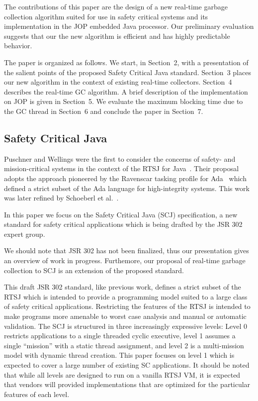 The contributions of this paper are the design of a new real-time garbage
collection algorithm suited for use in safety critical systems and its
implementation in the JOP embedded Java processor. Our preliminary
evaluation suggests that our the new algorithm is efficient and has
highly predictable behavior.

The paper is organized as follows. We start, in Section~2, with a
presentation of the salient points of the proposed Safety Critical
Java standard. Section~3 places our new algorithm in the context of
existing real-time collectors. Section~4 describes the real-time GC
algorithm. A brief description of the implementation on JOP is given
in Section~5. We evaluate the maximum blocking time due to the GC
thread in Section~6 and conclude the paper in Section~7.

\subsection{Safety Critical Java}

Puschner and Wellings were the first to consider the concerns of
safety- and mission-critical systems in the context of the RTSJ for
Java~\cite{Pusch01}. Their proposal adopts the approach pioneered by
the Ravenscar tasking profile for Ada~\cite{697453} which defined a
strict subset of the Ada language for high-integrity systems.  This
work was later refined by Schoeberl et al.~\cite{jop:scjava}.

In this paper we focus on the Safety Critical Java (SCJ) specification, a
new standard for safety critical applications which is being drafted by the
JSR 302 expert group.

We should note that JSR 302 has not been finalized, thus our presentation
gives an overview of work in progress. Furthemore, our proposal of real-time
garbage collection to SCJ is an extension of the proposed standard.


This draft JSR 302 standard, like previous work, defines a strict subset of
the RTSJ which is intended to provide a programming model suited to a large
class of safety critical applications. Restricting the features of the RTSJ
is intended to make programs more amenable to worst case analysis and manual
or automatic validation. The SCJ is structured in three increasingly
expressive levels: Level 0 restricts applications to a single threaded
cyclic executive, level 1 assumes a single ``mission'' with a static thread
assignment, and level 2 is a multi-mission model with dynamic thread
creation. This paper focuses on level 1 which is expected to cover a large
number of existing SC applications. It should be noted that while all levels
are designed to run on a vanilla RTSJ VM, it is expected that vendors will
provided implementations that are optimized for the particular features of
each level.


